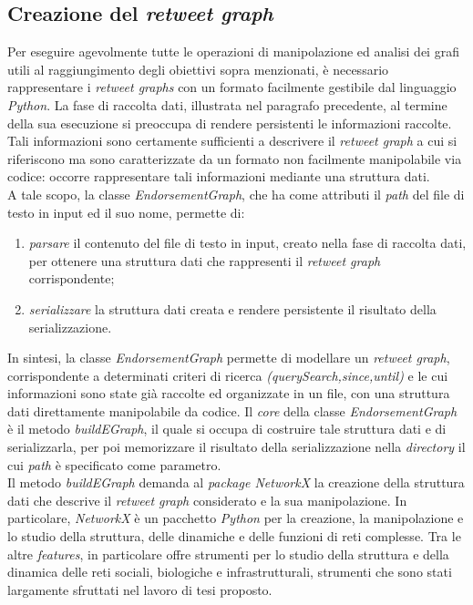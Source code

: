 \subsection{Creazione del \textit{retweet graph}}
Per eseguire agevolmente tutte le operazioni di manipolazione ed analisi dei grafi utili al raggiungimento degli obiettivi sopra menzionati, è necessario rappresentare i \textit{retweet graphs} con un formato facilmente gestibile dal linguaggio \textit{Python}. La fase di raccolta dati, illustrata nel paragrafo precedente, al termine della sua esecuzione si preoccupa di rendere persistenti le informazioni raccolte. Tali informazioni sono certamente sufficienti a descrivere il \textit{retweet graph} a cui si riferiscono ma sono caratterizzate da un formato non facilmente manipolabile via codice: occorre rappresentare tali informazioni mediante una struttura dati.
\\A tale scopo, la classe \textit{EndorsementGraph}, che ha come attributi il \textit{path} del file di testo in input ed il suo nome, permette di:
\begin{enumerate}
\item \textit{parsare} il contenuto del file di testo in input, creato nella fase di raccolta dati, per ottenere una struttura dati che rappresenti il \textit{retweet graph} corrispondente;
\item \textit{serializzare} la struttura dati creata e rendere persistente il risultato della serializzazione.
\end{enumerate}
In sintesi, la classe \textit{EndorsementGraph} permette di modellare un \textit{retweet graph}, corrispondente a determinati criteri di ricerca \textit{(querySearch,since,until)} e le cui informazioni sono state già raccolte ed organizzate in un file, con una struttura dati direttamente manipolabile da codice. 
Il \textit{core} della classe \textit{EndorsementGraph} è il metodo \textit{buildEGraph}, il quale si occupa di costruire tale struttura dati e di serializzarla, per poi memorizzare il risultato della serializzazione nella \textit{directory} il cui \textit{path} è specificato come parametro.
\\Il metodo \textit{buildEGraph} demanda al \textit{package NetworkX} la creazione della struttura dati che descrive il \textit{retweet graph} considerato e la sua manipolazione. In particolare, \textit{NetworkX} è un pacchetto \textit{Python} per la creazione, la manipolazione e lo studio della struttura, delle dinamiche e delle funzioni di reti complesse. Tra le altre \textit{features}, in particolare offre strumenti per lo studio della struttura e della dinamica delle reti sociali, biologiche e infrastrutturali, strumenti che sono stati largamente sfruttati nel lavoro di tesi proposto.
